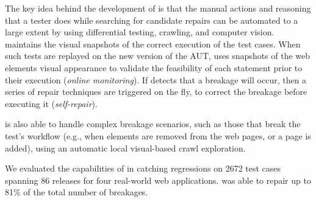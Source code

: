 

The key idea behind the development of \tool is that the manual actions and reasoning that a tester does while searching for candidate repairs can be automated to a large extent by using differential testing, crawling, and computer vision. 
\tool maintains the visual snapshots of the correct execution of the test cases. When such tests are replayed on the new version of the AUT, \tool uses snapshots of the web elements visual appearance to validate the feasibility of each statement prior to their execution (\textit{online monitoring}). If \tool detects that a breakage will occur, then a series of repair techniques are triggered on the fly, to correct the breakage before executing it (\textit{self-repair}).

\tool is also able to handle complex breakage scenarios, such as those that break the test's workflow (e.g., when elements are removed from the web pages, or a page is added), using an automatic local visual-based crawl exploration.

We evaluated the capabilities of \tool in catching regressions on 2672 test cases spanning 86 releases for four real-world web applications. \tool was able to repair up to 81\% of the total number of breakages. 


